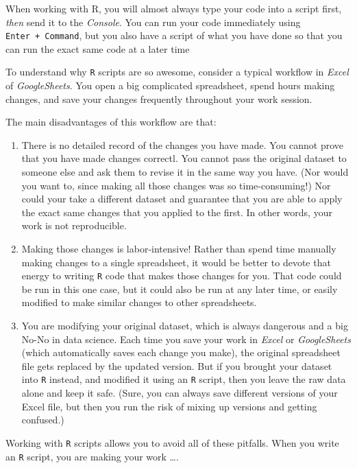\documentclass[
]{book}
\begin{document}
When working with R, you will almost always type your code into a script first, \emph{then} send it to the \emph{Console}. You can run your code immediately using \texttt{Enter\ +\ Command}, but you also have a script of what you have done so that you can run the exact same code at a later time

To understand why \texttt{R} scripts are so awesome, consider a typical workflow in \emph{Excel} of \emph{GoogleSheets}. You open a big complicated spreadsheet, spend hours making changes, and save your changes frequently throughout your work session.

The main disadvantages of this workflow are that:

\begin{enumerate}
\def\labelenumi{\arabic{enumi}.}
\item
  There is no detailed record of the changes you have made. You cannot prove that you have made changes correctl. You cannot pass the original dataset to someone else and ask them to revise it in the same way you have. (Nor would you want to, since making all those changes was so time-consuming!) Nor could your take a different dataset and guarantee that you are able to apply the exact same changes that you applied to the first. In other words, your work is not reproducible.
\item
  Making those changes is labor-intensive! Rather than spend time manually making changes to a single spreadsheet, it would be better to devote that energy to writing \texttt{R} code that makes those changes for you. That code could be run in this one case, but it could also be run at any later time, or easily modified to make similar changes to other spreadsheets.
\item
  You are modifying your original dataset, which is always dangerous and a big No-No in data science. Each time you save your work in \emph{Excel} or \emph{GoogleSheets} (which automatically saves each change you make), the original spreadsheet file gets replaced by the updated version. But if you brought your dataset into \texttt{R} instead, and modified it using an \texttt{R} script, then you leave the raw data alone and keep it safe. (Sure, you can always save different versions of your Excel file, but then you run the risk of mixing up versions and getting confused.)
\end{enumerate}

Working with \texttt{R} scripts allows you to avoid all of these pitfalls. When you write an \texttt{R} script, you are making your work \ldots.
\end{document}
